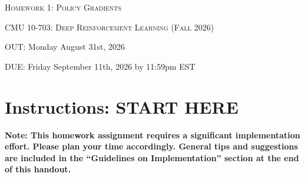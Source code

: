 \documentclass[12pt]{article}
\begin{document}
\section*{}
\begin{center}
  \centerline{\textsc{\LARGE  Homework 1: Policy Gradients}}
  \vspace{1em}
  \textsc{\large CMU 10-703: Deep Reinforcement Learning (Fall 2026)} \\
  \vspace{1em}
  \centerline{OUT: Monday August 31st, 2026}
  \centerline{DUE: Friday September 11th, 2026 by 11:59pm EST}
\end{center}

\section*{Instructions: START HERE}
\textbf{Note: This homework assignment requires a significant implementation effort. Please plan your time accordingly. General tips and suggestions are included in the ``Guidelines on Implementation'' section at the end of this handout.}
\end{document}
